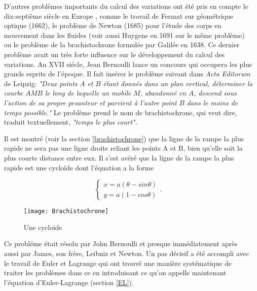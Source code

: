 \documentclass[10pt,a4paper]{article}%
\theoremstyle{theorem}
\theoremstyle{definition}
\begin{document}
	
	D'autres problèmes importants du calcul des variations ont été pris en compte le dix-septième siècle en Europe \cite{goldstine80}, comme le travail de Fermat sur géométrique optique (1662), le problème de Newton (1685) pour l'étude des corps en mouvement dans les fluides (voir aussi Huygens en 1691 sur le même problème) ou le problème de la brachistochrone formulée par Galilée en 1638. Ce dernier problème avait un très forte influence sur le développement du calcul des variations.  Au XVII siécle, Jean Bernoulli lance un concours qui occupera les plus grands esprits de l'époque. Il fait insérer le problème suivant dans \textit{Acta Editorum} de Leipzig: \textit{"Deux points $A$ et $B$ étant donnés dans un plan vertical, déterminer la courbe $AMB$ le long de laquelle un mobile $M$, abandonné en $A$, descend sous l'action de sa propre pesanteur et parvient à l'autre point $B$ dans le moins de temps possible."} Le problème prend le nom de brachistochrone, qui veut dire, traduit textuellement, \textit{"temps le plus court".} 
	
	Il est montré (voir la section \ref{brachistochrone}) que la ligne de la rampe la plus rapide ne sera pas une ligne droite reliant les points A et B, bien qu'elle soit la plus courte distance entre eux. Il s'est avéré que la ligne de la rampe la plus rapide est une cycloïde dont l'équation a la forme
		 	
	\begin{equation*}
	 	\begin{cases}
		 	x=a(\theta-sin\theta)
		 	\\
	 		y=a(1-cos\theta)
	 	\end{cases}.
 	\end{equation*}
 	
 	\begin{figure}[h]
 	
 		\begin{center}
 			\texttt{[image: Brachistochrone]}
 		\end{center}
 	\caption{Une cycloide}\label{brach.figure}
 	\end{figure}
 	
 	
 	Ce probléme était résolu par John Bernoulli et presque immédiatement après aussi par James, son frère, Leibniz et Newton. Un pas décisif a été accompli avec le travail de Euler et Lagrange qui ont trouvé une manière systématique de traiter les problèmes dans ce en introduisant ce qu'on appelle maintenant l'équation d'Euler-Lagrange (section \ref{EL}). 
 	
\end{document}
